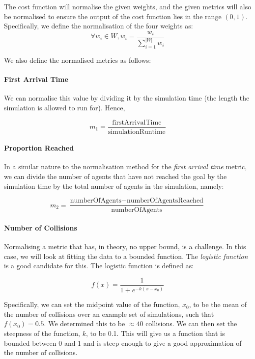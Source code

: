 \documentclass[12pt]{article}
\begin{document}
The cost function will normalise the given weights, and the given metrics will also be normalised to ensure the output of the cost function lies in the range $(0,1)$. Specifically, we define the normalisation of the four weights as:
\begin{equation}
    \forall w_i \in W, w_i = \frac{w_i}{\sum_{i=1}^{|W|}{w_i}}
\end{equation}

We also define the normalised metrics as follows:

\paragraph{First Arrival Time}
We can normalise this value by dividing it by the simulation time (the length the simulation is allowed to run for). Hence,

\begin{equation}
    m_1 = \frac{\text{firstArrivalTime}}{\text{simulationRuntime}}
\end{equation}

\paragraph{Proportion Reached}
In a similar nature to the normalisation method for the \emph{first arrival time} metric, we can divide the number of agents that have not reached the goal by the simulation time by the total number of agents in the simulation, namely:

\begin{equation}
    m_2 = \frac{\text{numberOfAgents} - \text{numberOfAgentsReached}}{\text{numberOfAgents}}
\end{equation}

\paragraph{Number of Collisions}
Normalising a metric that has, in theory, no upper bound, is a challenge. In this case, we will look at fitting the data to a bounded function. The \emph{logistic function} is a good candidate for this. The logistic function is defined as:

\begin{equation}
    f(x) = \frac{1}{1 + e^{-k(x-x_0)}}
\end{equation}

Specifically, we can set the midpoint value of the function, $x_0$, to be the mean of the number of collisions over an example set of simulations, such that $f(x_0) = 0.5$. We determined this to be $\approx 40$ collisions. We can then set the steepness of the function, $k$, to be 0.1. This will give us a function that is bounded between 0 and 1 and is steep enough to give a good approximation of the number of collisions.
\end{document}
